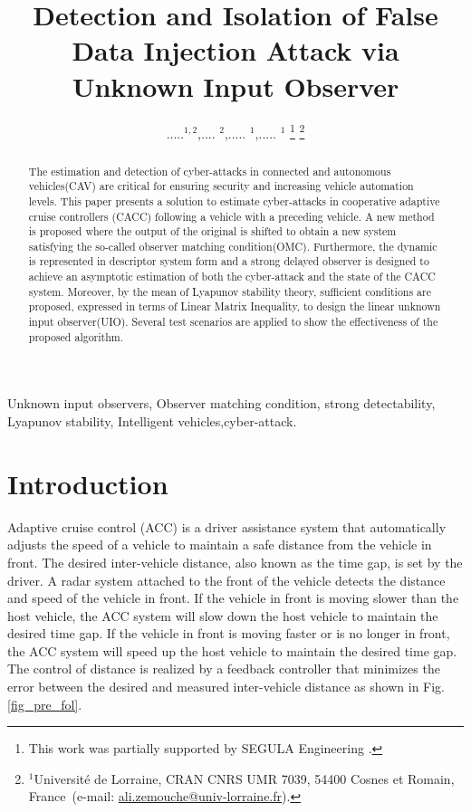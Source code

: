 \documentclass[letterpaper, 10 pt, conference]{ieeeconf}  %
\begin{document}
\title{\bf Detection and Isolation of False Data Injection Attack via Unknown Input Observer }
\author{.....$^{1,2}$,.... $^{2}$,..... $^{1}$,..... $^{1}$
\thanks{This work was partially supported by SEGULA Engineering .}
\thanks{$^{1}$Universit\'e de Lorraine, CRAN  CNRS UMR 7039, 54400 Cosnes et Romain, France~(e-mail: \protect\url{ali.zemouche@univ-lorraine.fr}).}
}
\maketitle

\begin{abstract}
The estimation and detection of cyber-attacks in connected and autonomous vehicles(CAV) are critical for ensuring security and increasing vehicle automation levels. This paper presents a solution to estimate cyber-attacks in cooperative adaptive cruise controllers (CACC) following a vehicle with a preceding vehicle. A new method is proposed where the output of the original is shifted to obtain a new system satisfying the so-called observer matching condition(OMC). Furthermore, the dynamic is represented in descriptor system form and a strong delayed observer is designed to achieve an asymptotic estimation of both the cyber-attack and the state of the CACC system. Moreover, by the mean of Lyapunov stability theory, sufficient conditions are proposed, expressed in terms of Linear Matrix Inequality, to design the linear unknown input observer(UIO). Several test scenarios are applied to show the effectiveness of the proposed algorithm.
\end{abstract}

\begin{Keywords}
Unknown input observers, Observer matching condition, strong detectability, Lyapunov stability, Intelligent vehicles,cyber-attack.
\end{Keywords}

\section{Introduction}
{\color{red}
Adaptive cruise control (ACC) is a driver assistance system that automatically adjusts the speed of a vehicle to maintain a safe distance from the vehicle in front. The desired inter-vehicle distance, also known as the time gap, is set by the driver. A radar system attached to the front of the vehicle detects the distance and speed of the vehicle in front. If the vehicle in front is moving slower than the host vehicle, the ACC system will slow down the host vehicle to maintain the desired time gap. If the vehicle in front is moving faster or is no longer in front, the ACC system will speed up the host vehicle to maintain the desired time gap. The control of distance is realized by a feedback controller that minimizes the error between the desired and measured inter-vehicle distance as shown in Fig. \ref{fig_pre_fol}.}\\
    
\end{document}

